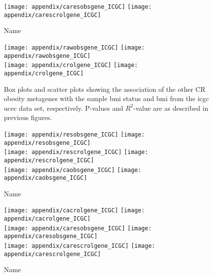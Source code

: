 \begin{appendices}
	\begin{figure}[htpb]
		\ContinuedFloat
		\captionsetup{list=off,format=cont}
		\centering
		\texttt{[image: appendix/caresobsgene\_ICGC]}
		\hfill
		\texttt{[image: appendix/carescrolgene\_ICGC]}\\
		\caption{Name}
	\end{figure}

	\begin{figure}[!htpb]
		\centering
		\texttt{[image: appendix/rawobsgene\_ICGC]}
		\hfill
		\texttt{[image: appendix/rawobsgene\_ICGC]}\\
		\texttt{[image: appendix/crolgene\_ICGC]}
		\hfill
		\texttt{[image: appendix/crolgene\_ICGC]}\\
		\caption{Box plots and scatter plots showing the association of the other CR obesity metagenes with the sample \gls{bmi} status  and \gls{bmi} from the \gls{icgc} \gls{ucec} data set, respectively.
	P-values and $R^2$-value are as described in previous figures.}
		\label{fig:appendix/cr_ob_meta_box_scatter_ucec}
	\end{figure}

	\begin{figure}[htpb]
		\ContinuedFloat
		\captionsetup{list=off,format=cont}
		\centering
		\texttt{[image: appendix/resobsgene\_ICGC]}
		\hfill
		\texttt{[image: appendix/resobsgene\_ICGC]}\\
		\texttt{[image: appendix/rescrolgene\_ICGC]}
		\hfill
		\texttt{[image: appendix/rescrolgene\_ICGC]}\\
		\texttt{[image: appendix/caobsgene\_ICGC]}
		\hfill
		\texttt{[image: appendix/caobsgene\_ICGC]}\\
		\caption{Name}
	\end{figure}

	\begin{figure}[htpb]
		\ContinuedFloat
		\captionsetup{list=off,format=cont}
		\centering
		\texttt{[image: appendix/cacrolgene\_ICGC]}
		\hfill
		\texttt{[image: appendix/cacrolgene\_ICGC]}\\
		\texttt{[image: appendix/caresobsgene\_ICGC]}
		\hfill
		\texttt{[image: appendix/caresobsgene\_ICGC]}\\
		\texttt{[image: appendix/carescrolgene\_ICGC]}
		\hfill
		\texttt{[image: appendix/carescrolgene\_ICGC]}\\
		\caption{Name}
	\end{figure}


\end{appendices}
